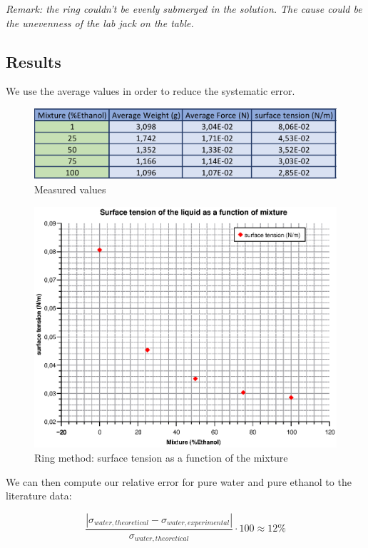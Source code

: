\documentclass{scrartcl}
\begin{document}
\medskip

\textit{Remark: the ring couldn't be evenly submerged in the solution. The cause could be the unevenness of the lab jack on the table.}

\newpage

\subsection{Results}

We use the average values in order to reduce the systematic error.

\begin{figure}[h]
    \centering
    \includegraphics{Mappe1.png}
    \caption{Measured values}
    \label{fig:2}
\end{figure}

\begin{figure}[htbp]
    \centering
    \includegraphics[width=12cm]{RingMethodSurfaceTension.eps}
    \caption{Ring method: surface tension as a function of the mixture}
    \label{fig:3}
\end{figure}

We can then compute our relative error for pure water and pure ethanol to the literature data:

\begin{equation}
    \frac{|\sigma_{water,theoretical}-\sigma_{water,experimental}|}{\sigma_{water,theoretical}} \cdot 100 \approx 12 \%
\end{equation}
\end{document}
